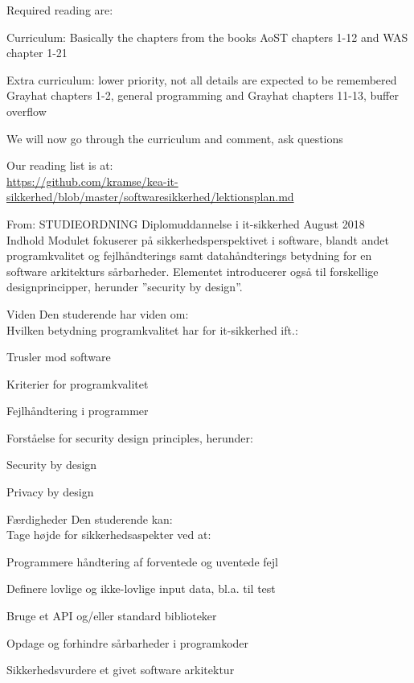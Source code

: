 \documentclass[Screen16to9,17pt]{foils}
\begin{document}
Required reading are:
\begin{list2}
\item Curriculum: Basically the chapters from the books AoST chapters 1-12 and WAS chapter 1-21
\item Extra curriculum: lower priority, not all details are expected to be remembered
Grayhat chapters 1-2, general programming and
Grayhat chapters 11-13, buffer overflow
\item We will now go through the curriculum and comment, ask questions
\end{list2}

Our reading list is at:\\
{\small\url{https://github.com/kramse/kea-it-sikkerhed/blob/master/softwaresikkerhed/lektionsplan.md}}



From: STUDIEORDNING Diplomuddannelse i it-sikkerhed August 2018\\
Indhold
Modulet fokuserer på sikkerhedsperspektivet i software, blandt andet
programkvalitet og fejlhåndterings samt datahåndterings betydning for en
software arkitekturs sårbarheder.
Elementet introducerer også til forskellige designprincipper, herunder ”security by design”.

Viden  Den studerende har viden om:\\
Hvilken betydning programkvalitet har for it-sikkerhed ift.:
\begin{list2}
\item Trusler mod software
\item Kriterier for programkvalitet
\item Fejlhåndtering i programmer
\item Forståelse for security design principles, herunder:
\item Security by design
\item Privacy by design
\end{list2}

Færdigheder Den studerende kan:\\
Tage højde for sikkerhedsaspekter ved at:
\begin{list2}
\item Programmere håndtering af forventede og uventede fejl
\item Definere lovlige og ikke-lovlige input data, bl.a. til test
\item Bruge et API og/eller standard biblioteker
\item Opdage og forhindre sårbarheder i programkoder
\item Sikkerhedsvurdere et givet software arkitektur
\end{list2}
\end{document}
